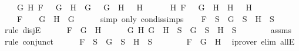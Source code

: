 \begin{isabellebody}
\ \ \ \ {\isacharparenleft}{\isacharparenleft}{\isasymexists}G{}\ H{}{\isachardot}\ F\ {\isacharequal}\ \isactrlbold {\isasymnot}\ {\isacharparenleft}G{}\ \isactrlbold {\isasymor}\ H{}{\isacharparenright}\ {\isasymand}\ G\ {\isacharequal}\ \isactrlbold {\isasymnot}\ G{}\ {\isasymand}\ H\ {\isacharequal}\ \isactrlbold {\isasymnot}\ H{}{\isacharparenright}\ {\isasymor}\ \isanewline
\ \ \ \ {\isacharparenleft}{\isasymexists}H{}{\isachardot}\ F\ {\isacharequal}\ \isactrlbold {\isasymnot}\ {\isacharparenleft}G\ \isactrlbold {\isasymrightarrow}\ H{}{\isacharparenright}\ {\isasymand}\ H\ {\isacharequal}\ \isactrlbold {\isasymnot}\ H{}{\isacharparenright}\ {\isasymor}\ \isanewline
\ \ \ \ F\ {\isacharequal}\ \isactrlbold {\isasymnot}\ {\isacharparenleft}\isactrlbold {\isasymnot}\ G{\isacharparenright}\ {\isasymand}\ H\ {\isacharequal}\ G{\isacharparenright}{\isachardoublequoteclose}\isanewline
\ \ \ \ \isamarkupfalse%
\ {\isacharparenleft}simp\ only{\isacharcolon}\ con{\isacharunderscore}dis{\isacharunderscore}simps{\isacharparenleft}{}{\isacharparenright}{\isacharparenright}\isanewline
\ \ \isamarkupfalse%
\ {\isachardoublequoteopen}F\ {\isasymin}\ S\ {\isasymlongrightarrow}\ G\ {\isasymin}\ S\ {\isasymand}\ H\ {\isasymin}\ S{\isachardoublequoteclose}\isanewline
\ \ \isamarkupfalse%
\ {\isacharparenleft}rule\ disjE{\isacharparenright}\isanewline
\ \ \ \ \isamarkupfalse%
\ {\isachardoublequoteopen}F\ {\isacharequal}\ G\ \isactrlbold {\isasymand}\ H{\isachardoublequoteclose}\isanewline
\ \ \ \ \isamarkupfalse%
\ {\isachardoublequoteopen}{\isasymforall}G\ H{\isachardot}\ G\ \isactrlbold {\isasymand}\ H\ {\isasymin}\ S\ {\isasymlongrightarrow}\ G\ {\isasymin}\ S\ {\isasymand}\ H\ {\isasymin}\ S{\isachardoublequoteclose}\isanewline
\ \ \ \ \ \ \isamarkupfalse%
\ assms\ \isamarkupfalse%
\ {\isacharparenleft}rule\ conjunct{}{\isacharparenright}\isanewline
\ \ \ \ \isamarkupfalse%
\ {\isachardoublequoteopen}F\ {\isasymin}\ S\ {\isasymlongrightarrow}\ G\ {\isasymin}\ S\ {\isasymand}\ H\ {\isasymin}\ S{\isachardoublequoteclose}\isanewline
\ \ \ \ \ \ \isamarkupfalse%
\ {\isacartoucheopen}F\ {\isacharequal}\ G\ \isactrlbold {\isasymand}\ H{\isacartoucheclose}\ \isamarkupfalse%
\ {\isacharparenleft}iprover\ elim{\isacharcolon}\ allE{\isacharparenright}\isanewline
\ \ \isamarkupfalse%

\end{isabellebody}
